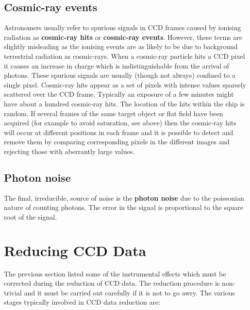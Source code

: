 \documentclass[twoside,11pt]{article}
\newcommand{\xlabel}[1]{}
\begin{document}
\subsection{Cosmic-ray events}

Astronomers usually refer to spurious signals in CCD frames caused by
ionising radiation as {\bf cosmic-ray hits} or {\bf cosmic-ray events}.
However, these terms are slightly misleading as the ionising events are
as likely to be due to background terrestrial radiation as cosmic-rays.
When a cosmic-ray particle hits a CCD pixel it causes an increase in
charge which is indistinguishable from the arrival of photons.  These
spurious signals are usually (though not always) confined to a single
pixel.  Cosmic-ray hits appear as a set of pixels with intense values
sparsely scattered over the CCD frame.  Typically an exposure of a few
minutes might have about a hundred cosmic-ray hits.  The location of the
hits within the chip is random.  If several frames of the same target
object or flat field have been acquired (for example to avoid saturation,
see above) then the cosmic-ray hits will occur at different positions in
each frame and it is possible to detect and remove them by comparing
corresponding pixels in the different images and rejecting those with
aberrantly large values.

\subsection{Photon noise}

The final, irreducible, source of noise is the {\bf photon noise} due to
the poissonian nature of counting photons.  The error in the signal is
proportional to the square root of the signal.


\section{\xlabel{REDUCE}\label{REDUCE}Reducing CCD Data}

The previous section listed some of the instrumental effects which must
be corrected during the reduction of CCD data.  The reduction procedure
is non-trivial and it must be carried out carefully if it is not to go
awry.  The various stages typically involved in CCD data reduction are:
\end{document}
